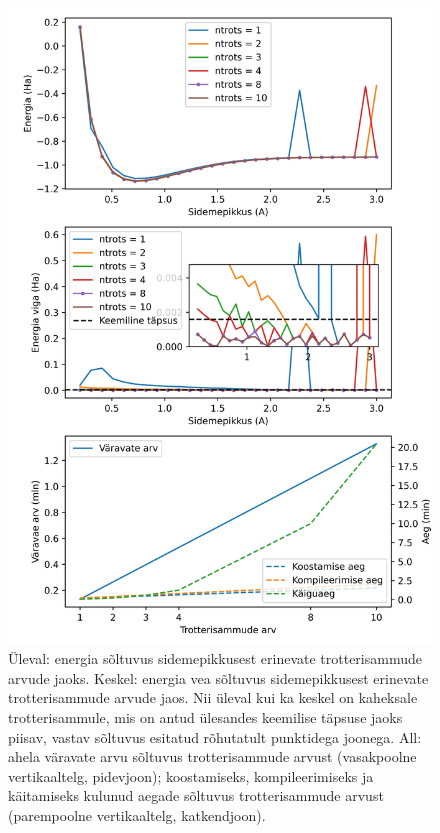 \documentclass[12pt]{report}
\begin{document}
\begin{figure}
  \centering
  \includegraphics[height=.75\vsize]{h2plots.jpg}
  \caption{Üleval: energia sõltuvus sidemepikkusest erinevate trotterisammude arvude jaoks.
    Keskel: energia vea sõltuvus sidemepikkusest erinevate trotterisammude arvude jaos.
    Nii üleval kui ka keskel on kaheksale trotterisammule, mis on antud ülesandes keemilise täpsuse jaoks piisav, vastav sõltuvus esitatud rõhutatult punktidega joonega.
    All: ahela väravate arvu sõltuvus trotterisammude arvust (vasakpoolne vertikaaltelg, pidevjoon); koostamiseks, kompileerimiseks ja käitamiseks kulunud aegade sõltuvus trotterisammude arvust (parempoolne vertikaaltelg, katkendjoon).}
  \label{fig:h2plots}
\end{figure}
\end{document}
